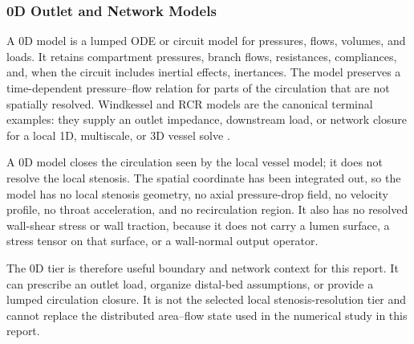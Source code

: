 \subsubsection{0D Outlet and Network Models}
\label{subsubsec:0d-models}

A 0D model is a lumped ODE or circuit model for pressures, flows, volumes, and
loads. It retains compartment pressures, branch flows, resistances,
compliances, and, when the circuit includes inertial effects, inertances. The
model preserves a time-dependent pressure--flow relation for parts of the
circulation that are not spatially resolved. Windkessel and RCR models are the
canonical terminal examples: they supply an outlet impedance, downstream load,
or network closure for a local 1D, multiscale, or 3D vessel solve
\cite{ShiEtAl2011BloodFlowModelReview,KopplHelmig2023DimensionReducedModeling}.

A 0D model closes the circulation seen by the local vessel model; it does not
resolve the local stenosis. The spatial coordinate has been integrated out, so
the model has no local stenosis geometry, no axial pressure-drop field, no
velocity profile, no throat acceleration, and no recirculation region. It also
has no resolved wall-shear stress or wall traction, because it does not carry a
lumen surface, a stress tensor on that surface, or a wall-normal output operator.

The 0D tier is therefore useful boundary and network context for this report. It
can prescribe an outlet load, organize distal-bed assumptions, or provide a
lumped circulation closure. It is not the selected local stenosis-resolution
tier and cannot replace the distributed area--flow state used in the numerical
study in this report.

